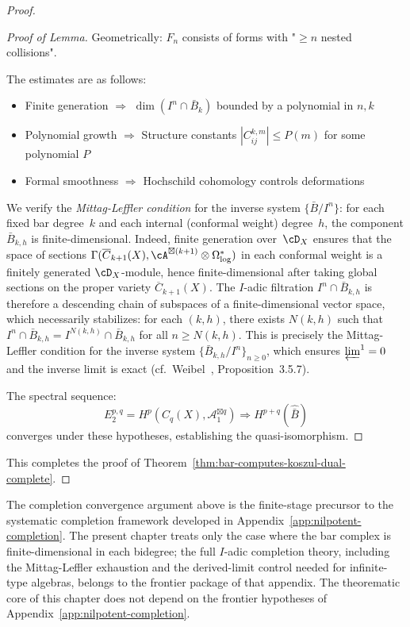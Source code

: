 \begin{proof}
\begin{proof}[Proof of Lemma]
Geometrically: $F_n$ consists of forms with "$\geq n$ nested collisions".

The estimates are as follows:
\begin{itemize}
\item Finite generation $\Rightarrow$ $\dim(I^n \cap \bar{B}_k)$ bounded by a polynomial in $n,k$
\item Polynomial growth $\Rightarrow$ Structure constants $|C_{ij}^{k,m}| \leq P(m)$ for some polynomial $P$
\item Formal smoothness $\Rightarrow$ Hochschild cohomology controls deformations
\end{itemize}

We verify the \emph{Mittag-Leffler condition} for the inverse system $\{\bar{B}/I^n\}$: for each fixed bar degree~$k$ and each internal (conformal weight) degree~$h$, the component $\bar{B}_{k,h}$ is finite-dimensional.  Indeed, finite generation over~$\cD_X$ ensures that the space of sections $\Gamma(\overline{C}_{k+1}(X), \cA^{\boxtimes(k+1)} \otimes \Omega^*_{\log})$ in each conformal weight is a finitely generated $\cD_X$-module, hence finite-dimensional after taking global sections on the proper variety $\overline{C}_{k+1}(X)$.  The $I$-adic filtration $I^n \cap \bar{B}_{k,h}$ is therefore a descending chain of subspaces of a finite-dimensional vector space, which necessarily stabilizes: for each $(k,h)$, there exists $N(k,h)$ such that $I^n \cap \bar{B}_{k,h} = I^{N(k,h)} \cap \bar{B}_{k,h}$ for all $n \geq N(k,h)$.  This is precisely the Mittag-Leffler condition for the inverse system $\{\bar{B}_{k,h}/I^n\}_{n \geq 0}$, which ensures $\varprojlim^1 = 0$ and the inverse limit is exact (cf.\ Weibel~\cite{Weibel94}, Proposition~3.5.7).

The spectral sequence:
\[E_2^{p,q} = H^p(C_q(X), \mathcal{A}_1^{\boxtimes q}) \Rightarrow H^{p+q}(\widehat{\bar{B}})\]
converges under these hypotheses, establishing the quasi-isomorphism.
\end{proof}

This completes the proof of Theorem~\ref{thm:bar-computes-koszul-dual-complete}.
\end{proof}

\begin{remark}
The completion convergence argument above is the finite-stage precursor
to the systematic completion framework developed in
Appendix~\ref{app:nilpotent-completion}.  The present chapter treats
only the case where the bar complex is finite-dimensional in each
bidegree; the full $I$-adic completion theory, including the
Mittag-Leffler exhaustion and the derived-limit control needed for
infinite-type algebras, belongs to the frontier package of that
appendix.  The theorematic core of this chapter does not depend on
the frontier hypotheses of Appendix~\ref{app:nilpotent-completion}.
\end{remark}

